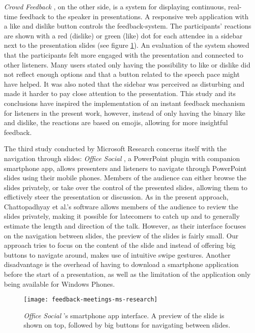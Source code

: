 \emph{Crowd Feedback} \cite{Teevan:MobileFeedbackDuringPresentation}, on the other side, is a system for displaying continuous, real-time feedback to the speaker in presentations. A responsive web application with a like and dislike button controls the feedback-system. The participants' reactions are shown with a red (dislike) or green (like) dot for each attendee in a sidebar next to the presentation slides (see figure \ref{fig:related-work-crowd-feedback}). An evaluation of the system showed that the participants felt more engaged with the presentation and connected to other listeners. Many users stated only having the possibility to like or dislike did not reflect enough options and that a button related to the speech pace might have helped. It was also noted that the sidebar was perceived as disturbing and made it harder to pay close attention to the presentation. This study and its conclusions have inspired the implementation of an instant feedback mechanism for listeners in the present work, however, instead of only having the binary like and dislike, the reactions are based on emojis, allowing for more insightful feedback.

The third study conducted by Microsoft Research concerns itself with the navigation through slides: \emph{Office Social} \cite{Chattopadhyay:OfficeSocialRemoteControl}, a PowerPoint plugin with companion smartphone app, allows presenters and listeners to navigate through PowerPoint slides using their mobile phones. Members of the audience can either browse the slides privately, or take over the control of the presented slides, allowing them to effictively steer the presentation or discussion. As in the present approach, Chattopadhyay et al.'s software allows members of the audience to review the slides privately, making it possible for latecomers to catch up and to generally estimate the length and direction of the talk. However, as their interface focuses on the navigation between slides, the preview of the slides is fairly small. Our approach tries to focus on the content of the slide and instead of offering big buttons to navigate around, makes use of intuitive swipe gestures. Another disadvantage is the overhead of having to download a smartphone application before the start of a presentation, as well as the limitation of the application only being available for Windows Phones.

\begin{figure}
\centering
\texttt{[image: feedback-meetings-ms-research]}
\caption{\emph{Office Social} \cite{Chattopadhyay:OfficeSocialRemoteControl}'s smartphone app interface. A preview of the slide is shown on top, followed by big buttons for navigating between slides.}
\label{fig:related-work-crowd-feedback}
\end{figure}

